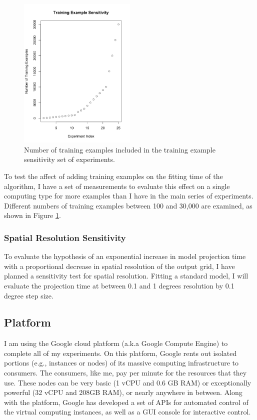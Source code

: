 \documentclass[a4paper]{article}
\begin{document}
\begin{figure}
\centering
\includegraphics[width=0.5\textwidth]{tSensitivity.png}
\caption{\label{fig:tSensitivty}Number of training examples included in the  training example sensitivity set of experiments.}
\end{figure}

To test the affect of adding training examples on the fitting time of the algorithm, I have a set of measurements to evaluate this effect on a single computing type for more examples than I have in the main series of experiments.  Different numbers of training examples between 100 and 30,000 are examined, as shown in Figure \ref{fig:tSensitivty}.

\subsubsection{Spatial Resolution Sensitivity}
To evaluate the hypothesis of an exponential increase in model projection time with a proportional decrease in spatial resolution of the output grid, I have planned a sensitivity test for spatial resolution.  Fitting a standard model, I will evaluate the projection time at between 0.1 and 1 degrees resolution by 0.1 degree step size.


\subsection{Platform}
I am using the Google cloud platform (a.k.a Google Compute Engine) to complete all of my experiments.  On this platform, Google rents out isolated portions (e.g., instances or nodes) of its massive computing infrastructure to consumers. The consumers, like me, pay per minute for the resources that they use.  These nodes can be very basic (1 vCPU and 0.6 GB RAM) or exceptionally powerful (32 vCPU and 208GB RAM), or nearly anywhere in between. Along with the platform, Google has developed a set of APIs for automated control of the virtual computing instances, as well as a GUI console for interactive control.
\end{document}

